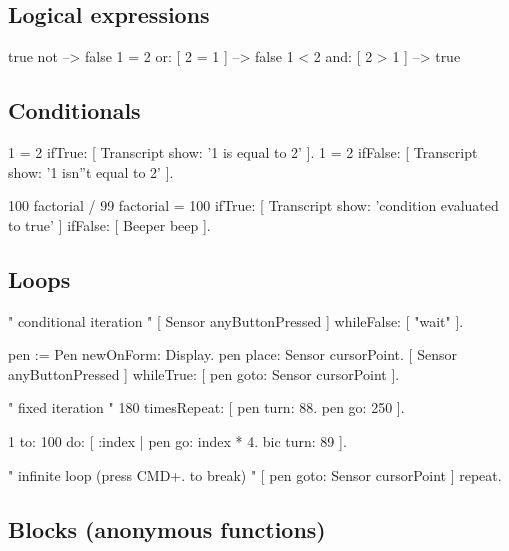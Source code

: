 \documentclass[8pt,a4paper]{leaflet}
\begin{document}
\subsection{Logical expressions}

\begin{code}
true not --> false
1 = 2 or: [ 2 = 1 ] --> false
1 < 2 and: [ 2 > 1 ] --> true
\end{code}
	
\newpage
\subsection{Conditionals}

\begin{code}
1 = 2 ifTrue: [ Transcript show: '1 is equal to 2' ].
1 = 2 ifFalse: [ Transcript show: '1 isn''t equal to 2' ].

100 factorial / 99 factorial = 100
	ifTrue: [ Transcript show: 'condition evaluated to true' ]
	ifFalse: [ Beeper beep ].
\end{code}

\subsection{Loops}

\begin{code}
" conditional iteration "
[ Sensor anyButtonPressed ] 
	whileFalse: [ "wait" ].

pen := Pen newOnForm: Display.
pen place: Sensor cursorPoint.
[ Sensor anyButtonPressed ]
	whileTrue: [ pen goto: Sensor cursorPoint ].

" fixed iteration "
180 timesRepeat: [
	pen turn: 88.
	pen go: 250 ].
	
1 to: 100 do: [ :index |
	pen go: index * 4.
 	bic turn: 89 ].

" infinite loop (press CMD+. to break) "	
[ pen goto: Sensor cursorPoint ] repeat.
\end{code}

\subsection{Blocks (anonymous functions)}
\end{document}
